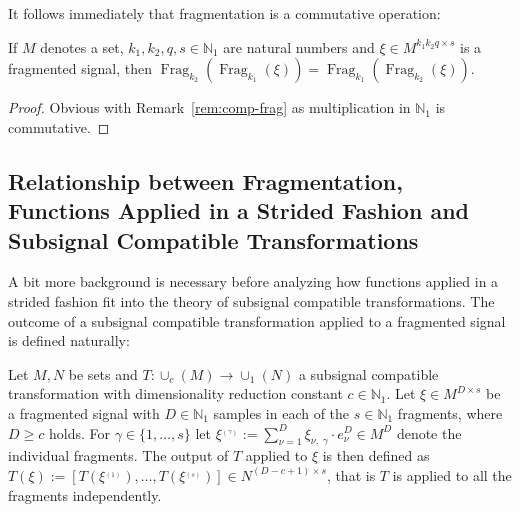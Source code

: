 \documentclass[journal]{IEEEtran}
\newcommand{\N}{\mathbb{N}}
\newcommand{\discint}[2]{\{#1,\dotsc,#2\}}
\newcommand{\inint}[2]{\in\discint{#1}{#2}}
\DeclareMathOperator{\Fragmentation}{Frag}
\begin{document}
It follows immediately that fragmentation is a commutative operation:
\begin{remark}
If $M$ denotes a set, $k_1,k_2,q,s\in\N_1$ are natural numbers and $\xi\in M^{k_1k_2q\times s}$ is a fragmented signal, then $\Fragmentation_{k_2}(\Fragmentation_{k_1}(\xi)) = \Fragmentation_{k_1}(\Fragmentation_{k_2}(\xi))$.
\end{remark}
\begin{proof}
Obvious with Remark~\ref{rem:comp-frag} as multiplication in $\N_1$ is commutative.
\end{proof}

\subsection{Relationship between Fragmentation, Functions Applied in a Strided Fashion and Subsignal Compatible Transformations}
\label{sect:fragmentation_relationship}
A bit more background is necessary before analyzing how functions applied in a strided fashion fit into the theory of subsignal compatible transformations.
The outcome of a subsignal compatible transformation applied to a fragmented signal is defined naturally:
\begin{definition}
\label{def:fragmentwise-evaluation}
Let $M,N$ be sets and $T\colon \cup_c(M) \to \cup_1(N)$ a subsignal compatible transformation with dimensionality reduction constant $c\in\N_1$.
Let $\xi\in M^{D\times s}$ be a fragmented signal with $D\in\N_1$ samples in each of the $s\in\N_1$ fragments, where $D\geq c$ holds.
For $\gamma\inint{1}{s}$ let $\xi^{_{(\gamma)}} := \sum_{\nu = 1}^D \xi_{\nu,\;\gamma}\cdot e_\nu^D\in M^D$ denote the individual fragments.
The output of $T$ applied to $\xi$ is then defined as $T(\xi) := [T(\xi^{_{(1)}}),\dotsc,T(\xi^{_{(s)}})]\in N^{(D - c + 1)\times s}$,
that is $T$ is applied to all the fragments independently.
\end{definition}
\end{document}
